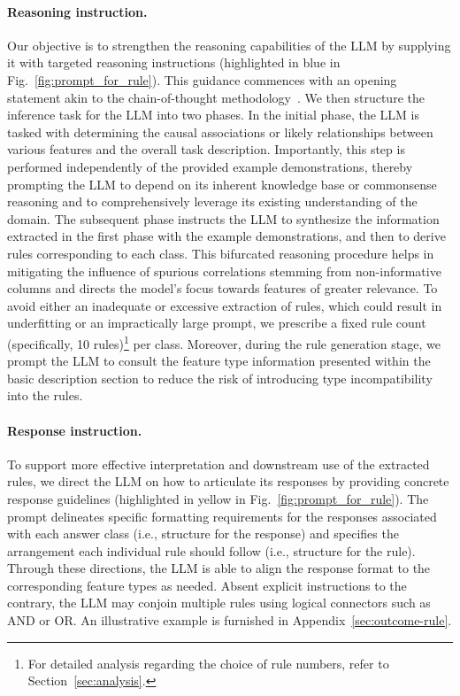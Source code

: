 \paragraph{Reasoning instruction.} Our objective is to strengthen the reasoning capabilities of the LLM by supplying it with targeted reasoning instructions (highlighted in blue in Fig.~\ref{fig:prompt_for_rule}). This guidance commences with an opening statement akin to the chain-of-thought methodology~\cite{wei2022chain}. We then structure the inference task for the LLM into two phases. In the initial phase, the LLM is tasked with determining the causal associations or likely relationships between various features and the overall task description. Importantly, this step is performed independently of the provided example demonstrations, thereby prompting the LLM to depend on its inherent knowledge base or commonsense reasoning and to comprehensively leverage its existing understanding of the domain. The subsequent phase instructs the LLM to synthesize the information extracted in the first phase with the example demonstrations, and then to derive rules corresponding to each class. This bifurcated reasoning procedure helps in mitigating the influence of spurious correlations stemming from non-informative columns and directs the model's focus towards features of greater relevance. To avoid either an inadequate or excessive extraction of rules, which could result in underfitting or an impractically large prompt, we prescribe a fixed rule count (specifically, 10 rules)\footnote{For detailed analysis regarding the choice of rule numbers, refer to Section~\ref{sec:analysis}.} per class. Moreover, during the rule generation stage, we prompt the LLM to consult the feature type information presented within the basic description section to reduce the risk of introducing type incompatibility into the rules.

\vspace*{-0.12in}
\paragraph{Response instruction.} To support more effective interpretation and downstream use of the extracted rules, we direct the LLM on how to articulate its responses by providing concrete response guidelines (highlighted in yellow in Fig.~\ref{fig:prompt_for_rule}). The prompt delineates specific formatting requirements for the responses associated with each answer class (i.e., structure for the response) and specifies the arrangement each individual rule should follow (i.e., structure for the rule). Through these directions, the LLM is able to align the response format to the corresponding feature types as needed. Absent explicit instructions to the contrary, the LLM may conjoin multiple rules using logical connectors such as AND or OR. An illustrative example is furnished in Appendix~\ref{sec:outcome-rule}.


